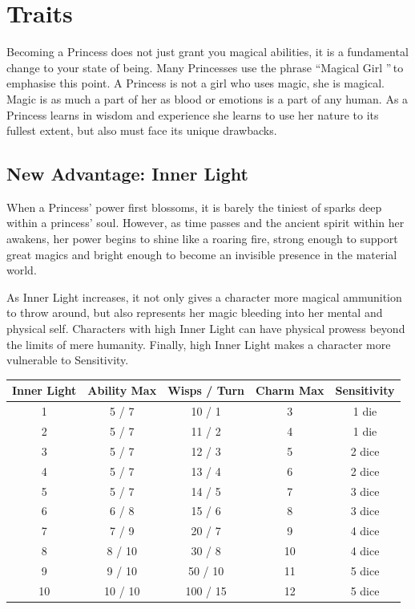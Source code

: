 \section*{Traits} 

Becoming a Princess does not just grant you magical abilities, it is a fundamental change to your state of being. Many Princesses use the phrase \textquotedblleft Magical Girl \textquotedblright\,to emphasise this point. A Princess is not a girl who uses magic, she is magical. Magic is as much a part of her as blood or emotions is a part of any human. As a Princess learns in wisdom and experience she learns to use her nature to its fullest extent, but also must face its unique drawbacks. 

\subsection*{New Advantage: Inner Light}
When a Princess' power first blossoms, it is barely the tiniest of sparks deep within a princess' soul. However, as time passes and the ancient spirit within her awakens, her power begins to shine like a roaring fire, strong enough to support great magics and bright enough to become an invisible presence in the material world.

As Inner Light increases, it not only gives a character more magical ammunition to throw around, but also represents her magic bleeding into her mental and physical self. Characters with high Inner Light can have physical prowess beyond the limits of mere humanity. Finally, high Inner Light makes a character more vulnerable to Sensitivity. 

\begin{table}[H]
    \begin{tabular}{|c|c|c|c|c|}
        \hline
        Inner Light & Ability Max & Wisps / Turn & Charm Max & Sensitivity \\ \hline
        1           & 5 / 7       & 10 / 1       & 3         & 1 die       \\ \hline
        2           & 5 / 7       & 11 / 2       & 4         & 1 die       \\ \hline
        3           & 5 / 7       & 12 / 3       & 5         & 2 dice      \\ \hline
        4           & 5 / 7       & 13 / 4       & 6         & 2 dice      \\ \hline
        5           & 5 / 7       & 14 / 5       & 7         & 3 dice      \\ \hline
        6           & 6 / 8       & 15 / 6       & 8         & 3 dice      \\ \hline
        7           & 7 / 9       & 20 / 7       & 9         & 4 dice      \\ \hline
        8           & 8 / 10       & 30 / 8       & 10        & 4 dice      \\ \hline
        9           & 9 / 10       & 50 / 10      & 11        & 5 dice      \\ \hline
        10          & 10 / 10     & 100 / 15     & 12        & 5 dice      \\
        \hline
    \end{tabular}
\end{table}

